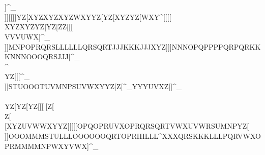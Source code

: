                                     \\\WXYWXYNNNPPPPPPLLLLMOIIIJJJHHHWYZ                                                            \\\KKKIIIKKKNNNLLLNNNMMMLLLMMMOOO]^_                                                            \\]][[\WXYZZ[ZZ[[[\VVVYZ[Z[\ZZ\YZ[_``                                                            ]]]YZ[XYZXYZXYZWXYYZ[YZ[XYZYZ[WXY\]^                                                            [[[[\\XYZXYZYZ[YZ[ZZ[[[\[\]VVVUWX]^_                                                            \\\MNPKKKLLLIIIPQRRSTKKKLLLLLLHHHYZ[                                                            [[[QRTOPRNOPOPRMMMRSTWXYXYZYYZWXY_`a                                                            ]]]MNPOPRQRSLLLLLLQRSQRTJJJKKKJJJXYZ                                                            ]]]NNNOPQPPPPQRPQRKKKNNNOOOQRSJJJ]^_                                                            \\\MNPWXZWXYQRTXYZWXYUVWQRSUVWTUW\]^                                                            \\\Z[\XYZYZ[YZ[XYZXXX\]][\][\][\]_``                                                            \\\\\]Z[\XYZXYZXYZXYZZ[\XYZXYZXYZ[\]                                                            YYY\\]YZ[[[\YZ[XYZ[[\\\]WXYOOO[\]]^_                                                            \\\HHHKKKMNPNOQQRTRSURSTQRSMOPPQRYZ[                                                            [[[OPQNOQPQROPQQRTTUVYZ[WXYXYYYZ[_`a                                                            \\\LLLOOOLLLMMMQRTJJJNNNKKKIIIIIIXYZ                                                            ]]]STUOOOTUVMNPSUVWXYYZ[Z[\Z[\RST]^_                                                            YYYUVXZ[\QRSLLLQRTSTVNNNLLLQSTTUW]^_                                                            \\\\\]YZ[YZ[YZ[[[\XXXYZ[WXY[\][\]__`                                                            ^^^]^^Z[\ZZ[YZ[YZ[YZ[ZZ\WXYXYZWXY[\]                                                            XXX\\]Z[\[\]Z[\[\][\]XYZUVWWXYYZ[[\]                                                            [[[OPQOPRUVXOPRQRSQRTVWXUVWRSUMNPYZ[                                                            \\\STUZ[\VWXUVWWXYSTU\]^[\][\]^__`aa                                                            \\\NNNLLLNOPNOQHHHHHHPQRKKKHHHOPQYZ[                                                            ]]]OOOMMMSTULLLOOOOOOQRTOPRIIILLL\]^                                                            XXXQRSKKKLLLPQRVWXOPRMMMMNPWXYVWX]^_                                 